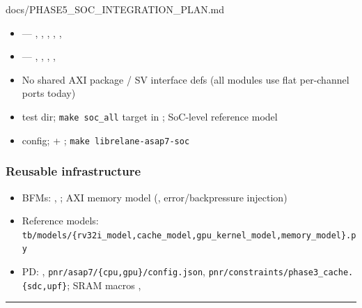 \begin{relocated}{docs/PHASE5_SOC_INTEGRATION_PLAN.md}
\begin{itemize}
\tightlist
\item
   --- , ,
  , ,
  , 
\item
   --- ,
  , ,
  , 
\item
  No shared AXI package / SV interface defs (all modules use flat
  per-channel ports today)
\item
   test dir; \texttt{make\ soc\_\allowbreak{}all}
  target in ; SoC-level reference model
\item
   config;  +
  ;
  \texttt{make\ librelane-\allowbreak{}asap7-\allowbreak{}soc}
\end{itemize}

\subsubsection{Reusable infrastructure}\label{ds:ch:phase5-soc-integration-plan:reusable-infrastructure}

\begin{itemize}
\tightlist
\item
  BFMs: , ;
  AXI memory model 
  (, error/\allowbreak{}backpressure
  injection)
\item
  Reference models:
  \texttt{tb/\allowbreak{}models/\allowbreak{}\{rv32i\_\allowbreak{}model,\allowbreak{}cache\_\allowbreak{}model,\allowbreak{}gpu\_\allowbreak{}kernel\_\allowbreak{}model,\allowbreak{}memory\_\allowbreak{}model\}.\allowbreak{}py}
\item
  PD: ,
  \texttt{pnr/\allowbreak{}asap7/\allowbreak{}\{cpu,\allowbreak{}gpu\}/\allowbreak{}config.\allowbreak{}json},
  \texttt{pnr/\allowbreak{}constraints/\allowbreak{}phase3\_\allowbreak{}cache.\allowbreak{}\{sdc,\allowbreak{}upf\}};
  SRAM macros , 
\end{itemize}

\begin{center}\rule{0.5\linewidth}{0.5pt}\end{center}


\end{relocated}
